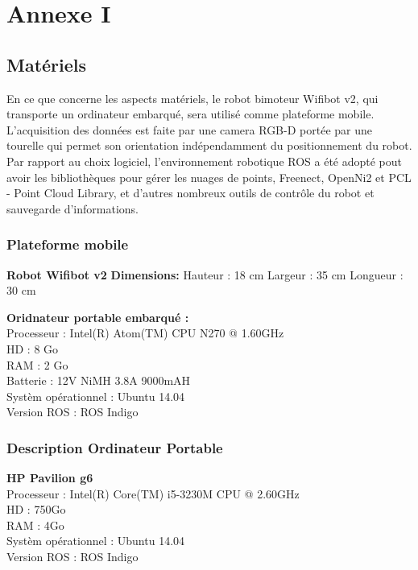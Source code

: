 \chapter{Annexe I}

\section{Matériels}

En ce que concerne les aspects matériels, le robot bimoteur Wifibot v2, qui transporte un ordinateur embarqué, sera utilisé comme plateforme mobile. L'acquisition des données est faite par une camera RGB-D portée par une tourelle qui permet son orientation indépendamment du positionnement du robot. Par rapport au choix logiciel, l'environnement robotique ROS a été adopté pout avoir les bibliothèques pour gérer les nuages de points, Freenect, OpenNi2 et PCL - Point Cloud Library, et d'autres nombreux outils de contrôle du robot et sauvegarde d'informations.

\subsection{ Plateforme mobile } 
\textbf{Robot Wifibot v2} 
\textbf{Dimensions:}
Hauteur : 18 cm 
Largeur : 35 cm 
Longueur : 30 cm 

\textbf{Oridnateur portable embarqué : } \\
Processeur : Intel(R) Atom(TM) CPU N270   @ 1.60GHz \\
HD : 8 Go \\
RAM : 2 Go \\
Batterie : 12V NiMH 3.8A 9000mAH \\

Systèm opérationnel : Ubuntu 14.04 \\
Version ROS : ROS Indigo \\ 

\subsection{Description Ordinateur Portable}

\textbf{HP Pavilion g6} \\
Processeur :  Intel(R) Core(TM) i5-3230M CPU @ 2.60GHz \\
HD : 750Go \\
RAM : 4Go \\

Systèm opérationnel : Ubuntu 14.04 \\
Version ROS : ROS Indigo \\

